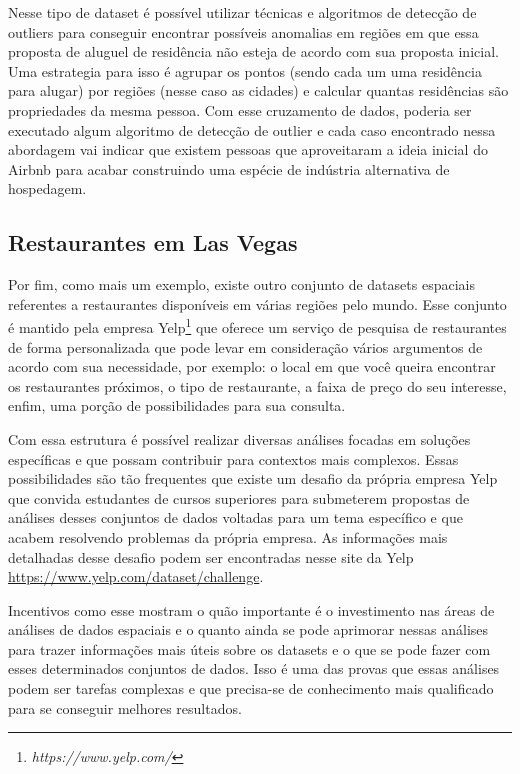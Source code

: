 Nesse tipo de dataset é possível utilizar técnicas e algoritmos de detecção de outliers para conseguir encontrar possíveis anomalias em regiões em que essa proposta de aluguel de residência não esteja de acordo com sua proposta inicial. Uma estrategia para isso é agrupar os pontos (sendo cada um uma residência para alugar) por regiões (nesse caso as cidades) e calcular quantas residências são propriedades da mesma pessoa. Com esse cruzamento de dados, poderia ser executado algum algoritmo de detecção de outlier e cada caso encontrado nessa abordagem vai indicar que existem pessoas que aproveitaram a ideia inicial do Airbnb para acabar construindo uma espécie de indústria alternativa de hospedagem.

\subsection{Restaurantes em Las Vegas}

Por fim, como mais um exemplo, existe outro conjunto de datasets espaciais referentes a restaurantes disponíveis em várias regiões pelo mundo. Esse conjunto é mantido pela empresa Yelp\footnote{\it https://www.yelp.com/} que oferece um serviço de pesquisa de restaurantes de forma personalizada que pode levar em consideração vários argumentos de acordo com sua necessidade, por exemplo: o local em que você queira encontrar os restaurantes próximos, o tipo de restaurante, a faixa de preço do seu interesse, enfim, uma porção de possibilidades para sua consulta.

Com essa estrutura é possível realizar diversas análises focadas em soluções específicas e que possam contribuir para contextos mais complexos. Essas possibilidades são tão frequentes que existe um desafio da própria empresa Yelp que convida estudantes de cursos superiores para submeterem propostas de análises desses conjuntos de dados voltadas para um tema específico e que acabem resolvendo problemas da própria empresa. As informações mais detalhadas desse desafio podem ser encontradas nesse site da Yelp \url{https://www.yelp.com/dataset/challenge}.

Incentivos como esse mostram o quão importante é o investimento nas áreas de análises de dados espaciais e o quanto ainda se pode aprimorar nessas análises para trazer informações mais úteis sobre os datasets e o que se pode fazer com esses determinados conjuntos de dados. Isso é uma das provas que essas análises podem ser tarefas complexas e que precisa-se de conhecimento mais qualificado para se conseguir melhores resultados.

